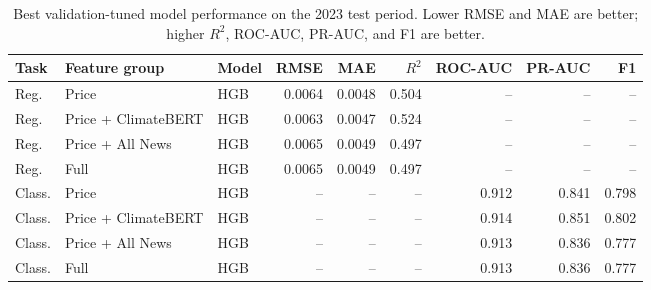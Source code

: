 \begin{table}[t]
  \caption{Best validation-tuned model performance on the 2023 test period. Lower RMSE and MAE are better; higher $R^2$, ROC-AUC, PR-AUC, and F1 are better.}
  \label{tab:model-performance}
  \centering
  \small
  \setlength{\tabcolsep}{4pt}
  \begin{tabular}{lllrrrrrr}
    \toprule
    Task & Feature group & Model & RMSE & MAE & $R^2$ & ROC-AUC & PR-AUC & F1 \\
    \midrule
    Reg. & Price & HGB & 0.0064 & 0.0048 & 0.504 & -- & -- & -- \\
    Reg. & Price + ClimateBERT & HGB & 0.0063 & 0.0047 & 0.524 & -- & -- & -- \\
    Reg. & Price + All News & HGB & 0.0065 & 0.0049 & 0.497 & -- & -- & -- \\
    Reg. & Full & HGB & 0.0065 & 0.0049 & 0.497 & -- & -- & -- \\
    Class. & Price & HGB & -- & -- & -- & 0.912 & 0.841 & 0.798 \\
    Class. & Price + ClimateBERT & HGB & -- & -- & -- & 0.914 & 0.851 & 0.802 \\
    Class. & Price + All News & HGB & -- & -- & -- & 0.913 & 0.836 & 0.777 \\
    Class. & Full & HGB & -- & -- & -- & 0.913 & 0.836 & 0.777 \\
    \bottomrule
  \end{tabular}
\end{table}
